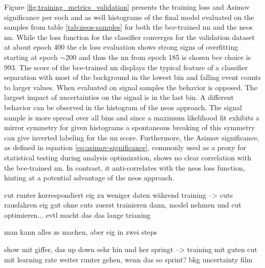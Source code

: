 Figure \ref{fig:training_metrics_validation} presents the training loss and Asimov significance per eoch and as well histograms of the final model evaluated on the samples from table \ref{tab:neos-samples} for both the \ac{bce}-trained \ac{nn} and the neos \ac{nn}. While the loss function for the classifier converges for the validation dataset at about epoch 400 the cls loss evaluation shows strong signs of overfitting starting at epoch $\sim$200  and thus the \ac{nn} from epoch 185 is chosen \ac{bce choice is 993}. The score of the \ac{bce}-trained \ac{nn} displays the typical feature of a classifier separation with most of the background in the lowest bin and falling event counts to larger values. When evaluated on signal samples the behavior is opposed. The largest impact of uncertainties on the signal is in the last bin. A different behavior can be observed in the histogram of the \ac{neos} approach. The signal sample is more spread over all bins and since a maximum likelihood fit exhibits a mirror symmetry for given histograms a spontaneous breaking of this symmetry can give inverted labeling for the \ac{nn} score. Furthermore, the Asimov significance, as defined in equation \ref{eq:asimov-significance}, commonly used as a proxy for statistical testing during analysis optimization, shows no clear correlation with the \ac{bce}-trained \ac{nn}. In contrast, it anti-correlates with the \ac{neos} loss function, hinting at a potential advantage of the neos approach.


cut runter korrespondiert eig zu weniger daten während training --> cuts rausfahren
eig gut ohne cuts zuerst trainieren dann, model nehmen und cut optimieren...  evtl macht das das lange trianing

man kann alles zs machen, aber eig in zwei steps

show mit giffer, das up down sehr hin und her springt --> training mit guten cut
mit learning rate weiter runter gehen, wenn das so sprint?
bkg uncertainty film

